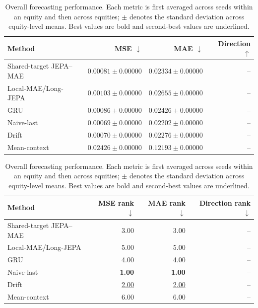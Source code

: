 \begin{table}[t]
\centering
\small
\caption{Overall forecasting performance. Each metric is first averaged across seeds within an equity and then across equities; $\pm$ denotes the standard deviation across equity-level means. Best values are bold and second-best values are underlined.}
\label{tab:main_metrics}
\begin{tabular}{lrrr}
\toprule
Method & MSE $\downarrow$ & MAE $\downarrow$ & Direction $\uparrow$ \\
\midrule
Shared-target JEPA--MAE & $0.00081 \pm 0.00000$ & $0.02334 \pm 0.00000$ & -- \\
Local-MAE/Long-JEPA & $0.00103 \pm 0.00000$ & $0.02655 \pm 0.00000$ & -- \\
GRU & $0.00086 \pm 0.00000$ & $0.02426 \pm 0.00000$ & -- \\
Naive-last & \textbf{$0.00069 \pm 0.00000$} & \textbf{$0.02202 \pm 0.00000$} & -- \\
Drift & \underline{$0.00070 \pm 0.00000$} & \underline{$0.02276 \pm 0.00000$} & -- \\
Mean-context & $0.02426 \pm 0.00000$ & $0.12193 \pm 0.00000$ & -- \\
\bottomrule
\end{tabular}
\par\medskip
\begin{tabular}{lrrr}
\toprule
Method & MSE rank $\downarrow$ & MAE rank $\downarrow$ & Direction rank $\downarrow$ \\
\midrule
Shared-target JEPA--MAE & 3.00 & 3.00 & -- \\
Local-MAE/Long-JEPA & 5.00 & 5.00 & -- \\
GRU & 4.00 & 4.00 & -- \\
Naive-last & \textbf{1.00} & \textbf{1.00} & -- \\
Drift & \underline{2.00} & \underline{2.00} & -- \\
Mean-context & 6.00 & 6.00 & -- \\
\bottomrule
\end{tabular}
\end{table}
